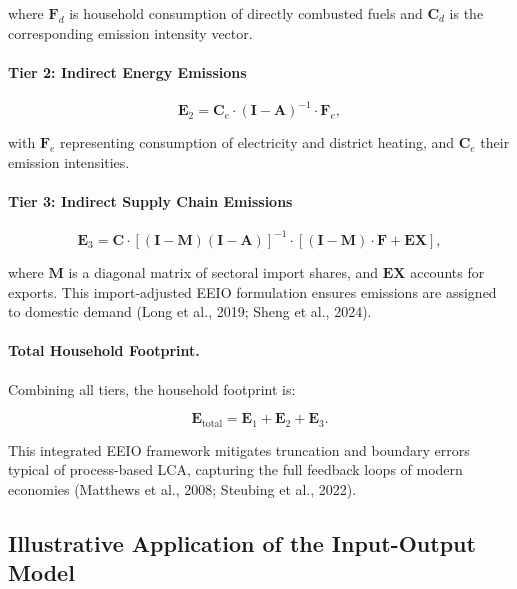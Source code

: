 \documentclass[12pt,a4paper]{article}%
\begin{document}
where \( \mathbf{F}_d \) is household consumption of directly combusted fuels and \( \mathbf{C}_d \) is the corresponding emission intensity vector.

\paragraph{Tier 2: Indirect Energy Emissions}

\begin{equation}
\mathbf{E}_2 = \mathbf{C}_e \cdot (\mathbf{I} - \mathbf{A})^{-1} \cdot \mathbf{F}_e,
\end{equation}

with \( \mathbf{F}_e \) representing consumption of electricity and district heating, and \( \mathbf{C}_e \) their emission intensities.

\paragraph{Tier 3: Indirect Supply Chain Emissions}

\begin{equation}
\mathbf{E}_3 = \mathbf{C} \cdot \left[(\mathbf{I} - \mathbf{M})(\mathbf{I} - \mathbf{A})\right]^{-1} \cdot \left[(\mathbf{I} - \mathbf{M}) \cdot \mathbf{F} + \mathbf{EX} \right],
\end{equation}

where \( \mathbf{M} \) is a diagonal matrix of sectoral import shares, and \( \mathbf{EX} \) accounts for exports. This import-adjusted EEIO formulation ensures emissions are assigned to domestic demand (Long et al., 2019; Sheng et al., 2024).

\paragraph{Total Household Footprint.}  
Combining all tiers, the household footprint is:

\begin{equation}
    \mathbf{E}_{\text{total}} = \mathbf{E}_1 + \mathbf{E}_2 + \mathbf{E}_3.
\end{equation}

This integrated EEIO framework mitigates truncation and boundary errors typical of process-based LCA, capturing the full feedback loops of modern economies (Matthews et al., 2008; Steubing et al., 2022).


\subsection{Illustrative Application of the Input-Output Model}
\end{document}

